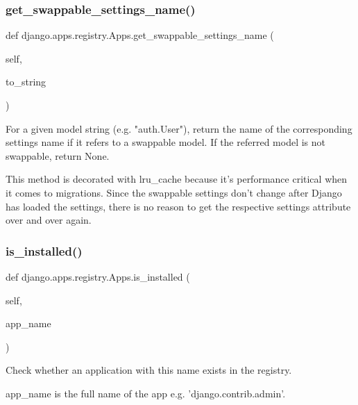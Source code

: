 \subsubsection{\texorpdfstring{get\+\_\+swappable\+\_\+settings\+\_\+name()}{get\_swappable\_settings\_name()}}
{\footnotesize\ttfamily def django.\+apps.\+registry.\+Apps.\+get\+\_\+swappable\+\_\+settings\+\_\+name (\begin{DoxyParamCaption}\item[{}]{self,  }\item[{}]{to\+\_\+string }\end{DoxyParamCaption})}

\begin{DoxyVerb}For a given model string (e.g. "auth.User"), return the name of the
corresponding settings name if it refers to a swappable model. If the
referred model is not swappable, return None.

This method is decorated with lru_cache because it's performance
critical when it comes to migrations. Since the swappable settings don't
change after Django has loaded the settings, there is no reason to get
the respective settings attribute over and over again.
\end{DoxyVerb}
 \mbox{\label{classdjango_1_1apps_1_1registry_1_1_apps_a3d207aa9742b3a6c90daff158a86bcdb}} 
\subsubsection{\texorpdfstring{is\+\_\+installed()}{is\_installed()}}
{\footnotesize\ttfamily def django.\+apps.\+registry.\+Apps.\+is\+\_\+installed (\begin{DoxyParamCaption}\item[{}]{self,  }\item[{}]{app\+\_\+name }\end{DoxyParamCaption})}

\begin{DoxyVerb}Check whether an application with this name exists in the registry.

app_name is the full name of the app e.g. 'django.contrib.admin'.
\end{DoxyVerb}
 \mbox{\label{classdjango_1_1apps_1_1registry_1_1_apps_a9f34ee8b1b29eb7e69bad8caf1a50d7f}} 
